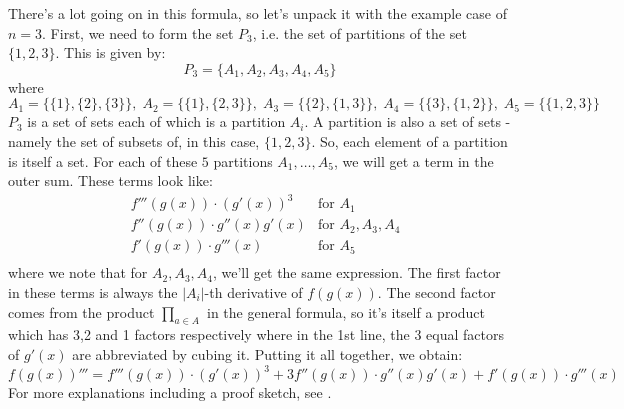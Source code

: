 \medskip
There's a lot going on in this formula, so let's unpack it with the example case of $n=3$. First, we need to form the set $P_3$, i.e. the set of partitions of the set $\{1,2,3\}$. This is given by:
\begin{equation}
P_3 = \{ A_1, A_2, A_3, A_4, A_5 \}
\end{equation}
where
\begin{equation}
A_1 = \{ \{1\},\{2\},\{3\} \},  \;
A_2 = \{ \{1\},\{2,3\} \},      \;
A_3 = \{ \{2\},\{1,3\} \},      \;
A_4 = \{ \{3\},\{1,2\} \},      \;
A_5 = \{ \{1,2,3\} \}
\end{equation}
$P_3$ is a set of sets each of which is a partition $A_i$. A partition is also a set of sets - namely the set of subsets of, in this case, $\{1,2,3\}$. So, each element of a partition is itself a set. For each of these $5$ partitions $A_1,\ldots,A_5$, we will get a term in the outer sum. These terms look like:
\begin{eqnarray}
&f'''(g(x)) \cdot (g'(x))^3        & \text{for $A_1$} \\
&f''(g(x))  \cdot g''(x) g'(x)     & \text{for $A_2,A_3,A_4$} \\
&f'(g(x))   \cdot g'''(x)          & \text{for $A_5$} \\
\end{eqnarray}
where we note that for $A_2,A_3,A_4$, we'll get the same expression. The first factor in these terms is always the $|A_i|$-th derivative of $f(g(x))$. The second factor comes from the product $\prod_{a \in A}$ in the general formula, so it's itself a product which has 3,2 and 1 factors respectively where in the 1st line, the 3 equal factors of $g'(x)$ are abbreviated by cubing it. Putting it all together, we obtain:
\begin{equation}
f(g(x))''' = 
  f'''(g(x)) \cdot (g'(x))^3 +
3 f''(g(x))  \cdot g''(x)    g'(x)  + 
  f'(g(x))   \cdot g'''(x) 
\end{equation}
For more explanations including a proof sketch, see \cite{YT_FaaDiBruno}.

